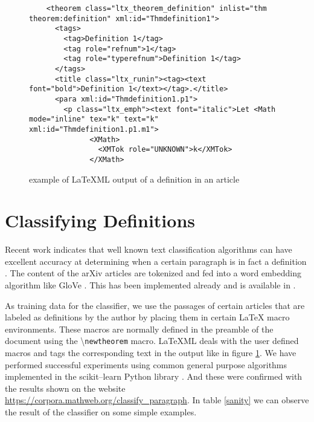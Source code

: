 \documentclass[a4paper]{easychair}
\begin{document}
\begin{center}
\begin{figure}[h]
    \label{xml1}
\begin{lstlisting}
    <theorem class="ltx_theorem_definition" inlist="thm theorem:definition" xml:id="Thmdefinition1">
      <tags>
        <tag>Definition 1</tag>
        <tag role="refnum">1</tag>
        <tag role="typerefnum">Definition 1</tag>
      </tags>
      <title class="ltx_runin"><tag><text font="bold">Definition 1</text></tag>.</title>
      <para xml:id="Thmdefinition1.p1">
        <p class="ltx_emph"><text font="italic">Let <Math mode="inline" tex="k" text="k" xml:id="Thmdefinition1.p1.m1">
              <XMath>
                <XMTok role="UNKNOWN">k</XMTok>
              </XMath>
\end{lstlisting}
    \caption{example of LaTeXML output of a definition in an article}
\end{figure}
\end{center}


\section{Classifying Definitions}
Recent work indicates that well known text classification algorithms \cite{bengio2003neural,chen2017improving} can have excellent accuracy  at determining when a certain paragraph is in fact a definition \cite{webscipara}. The content of the arXiv articles are tokenized and fed into a word embedding algorithm like GloVe \cite{pennington2014glove}. This has been  implemented already and is available in \cite{SML}. 

As training data for the classifier, we use the passages of certain articles that are labeled as definitions by the author by placing them in certain \LaTeX{} macro environments. These macros are normally defined in the preamble of the document using the \textbackslash \texttt{newtheorem} macro. LaTeXML deals with the user defined macros and tags the corresponding text in the output like in figure \ref{xml1}. We have performed successful experiments  using common general purpose algorithms implemented in the scikit--learn Python library \cite{scikit-learn}. And these were confirmed with the results shown on the website \url{https://corpora.mathweb.org/classify_paragraph}.
In table \ref{sanity} we can observe the result of the classifier on some simple examples.
\end{document}
